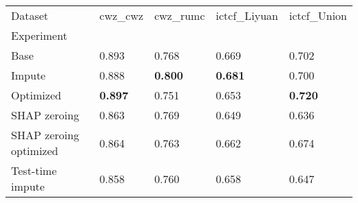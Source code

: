 \begin{tabular}{lllll}
\toprule
Dataset &         cwz_cwz &        cwz_rumc &    ictcf_Liyuan &     ictcf_Union \\
Experiment             &                 &                 &                 &                 \\
\midrule
Base                   &           0.893 &           0.768 &           0.669 &           0.702 \\
Impute                 &           0.888 &  \textbf{0.800} &  \textbf{0.681} &           0.700 \\
Optimized              &  \textbf{0.897} &           0.751 &           0.653 &  \textbf{0.720} \\
SHAP zeroing           &           0.863 &           0.769 &           0.649 &           0.636 \\
SHAP zeroing optimized &           0.864 &           0.763 &           0.662 &           0.674 \\
Test-time impute       &           0.858 &           0.760 &           0.658 &           0.647 \\
\bottomrule
\end{tabular}
